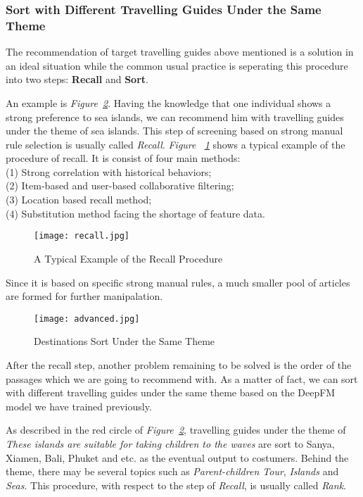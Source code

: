 \documentclass{article}
\begin{document}
    \subsubsection{Sort with Different Travelling Guides Under the Same Theme}

    The recommendation of target travelling guides above mentioned is a solution in an ideal situation while the common usual practice is seperating this procedure into two steps: \textbf{Recall} and \textbf{Sort}. 

    An example is \emph{Figure~\ref{fig:advance}}. Having the knowledge that one individual shows a strong preference to sea islands, we can recommend him with travelling guides under the theme of sea islands. This step of screening based on strong manual rule selection is usually called \emph{Recall}. \emph{Figure ~\ref{fig:recall}} shows a typical example of the procedure of recall. It is consist of four main methods:\\
    (1) Strong correlation with historical behaviors;\\
    (2) Item-based and user-based collaborative filtering;\\
    (3) Location based recall method;\\
    (4) Substitution method facing the shortage of feature data.

    \begin{figure}[!h]
		\centering
		\texttt{[image: recall.jpg]}
		\caption{\small{A Typical Example of the Recall Procedure}}
		\label{fig:recall}
	\end{figure}

    Since it is based on specific strong manual rules, a much smaller pool of articles are formed for further manipalation.   

    \begin{figure}[!h]
		\centering
		\texttt{[image: advanced.jpg]}
		\caption{\small{Destinations Sort Under the Same Theme}}
		\label{fig:advance}
	\end{figure}

	After the recall step, another problem remaining to be solved is the order of the passages which we are going to recommend with. As a matter of fact, we can sort with different travelling guides under the same theme based on the DeepFM model we have trained previously. 

	As described in the red circle of \emph{Figure~\ref{fig:advance}}, travelling guides under the theme of \emph{These islands are suitable for taking children to the waves} are sort to Sanya, Xiamen, Bali, Phuket and etc. as the eventual output to costumers. Behind the theme, there may be several topics such as \emph{Parent-children Tour}, \emph{Islands} and \emph{Seas}. This procedure, with respect to the step of \emph{Recall}, is usually called \emph{Rank}.
\end{document}
